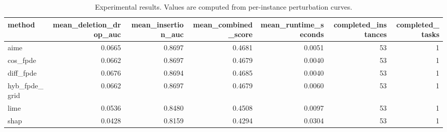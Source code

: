 \begin{table}[t]
\caption{Experimental results. Values are computed from per-instance perturbation curves.}
\label{tab:main_results_computed}
\centering
\begin{tabular}{lrrrrrr}
\toprule
method & mean\_deletion\_drop\_auc & mean\_insertion\_auc & mean\_combined\_score & mean\_runtime\_seconds & completed\_instances & completed\_tasks \\
\midrule
aime & 0.0665 & 0.8697 & 0.4681 & 0.0051 & 53 & 1 \\
cos\_fpde & 0.0662 & 0.8697 & 0.4679 & 0.0040 & 53 & 1 \\
diff\_fpde & 0.0676 & 0.8694 & 0.4685 & 0.0040 & 53 & 1 \\
hyb\_fpde\_grid & 0.0662 & 0.8697 & 0.4679 & 0.0060 & 53 & 1 \\
lime & 0.0536 & 0.8480 & 0.4508 & 0.0097 & 53 & 1 \\
shap & 0.0428 & 0.8159 & 0.4294 & 0.0304 & 53 & 1 \\
\bottomrule
\end{tabular}

\end{table}
